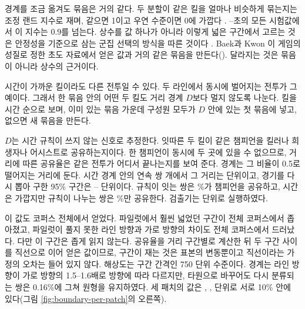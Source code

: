 

경계를 조금 옮겨도 묶음은 거의 같다. 두 분할이 같은 킬을 얼마나 비슷하게 묶는지는 조정 랜드 지수로 재며, 같으면 1이고 우연 수준이면 0에 가깝다 \cite{hubert1985comparing}. \ariPlateauLo{}--\ariPlateauHi{}초의 모든 시험값에서 이 지수는 0.9를 넘는다. 상수를 값 하나가 아니라 이렇게 넓은 구간에서 고르는 것은 안정성을 기준으로 삼는 군집 선택의 방식을 따른 것이다 \cite{campello2013hdbscan}. Baek과 Kwon \cite{baek2026killconditioned}이 게임의 성질로 정한 \cogGap{}초도 자료에서 얻은 값과 거의 같은 묶음을 만든다(\ariVsEighteen{}). 달라지는 것은 묶음이 아니라 상수의 근거이다.

시간이 가까운 킬이라도 다른 전투일 수 있다. 두 라인에서 동시에 벌어지는 전투가 그 예이다. 그래서 한 묶음 안의 어떤 두 킬도 거리 경계 $D$보다 멀지 않도록 나눈다. 킬을 시간 순으로 보며, 이미 있는 묶음 가운데 구성원 모두가 $D$ 안에 있는 첫 묶음에 넣고, 없으면 새 묶음을 만든다.

$D$는 시간 규칙이 쓰지 않는 신호로 추정한다. 잇따른 두 킬이 같은 챔피언을 킬러나 희생자나 어시스트로 공유하는지이다. 한 챔피언이 동시에 두 곳에 있을 수 없으므로, 거리에 따른 공유율은 같은 전투가 어디서 끝나는지를 보여 준다. 경계는 그 비율이 0.5로 떨어지는 거리에 둔다. 시간 경계 안의 연속 쌍 \numPairsDef{}개에서 그 거리는 \constDest{} 단위이고, 경기를 다시 뽑아 구한 95\% 구간은 \constDciLo{}--\constDciHi{} 단위이다. 규칙이 잇는 쌍은 \shareLinkedPairs{}\%가 챔피언을 공유하고, 시간은 가깝지만 규칙이 나누는 쌍은 \shareSeparatedPairs{}\%만 공유한다. 검출기는 \constD{} 단위로 실행하였다.

이 값도 코퍼스 전체에서 얻었다. 파일럿에서 훨씬 넓었던 구간이 전체 코퍼스에서 좁아졌고, 파일럿이 풀지 못한 라인 방향과 가로 방향의 차이도 전체 코퍼스에서 드러났다. 다만 이 구간은 좁게 읽지 않는다. 공유율을 거리 구간별로 계산한 뒤 두 구간 사이를 직선으로 이어 얻은 값이므로, 구간이 재는 것은 표본의 변동뿐이고 직선이라는 가정의 오차는 들어 있지 않다. 해상도는 구간 간격인 750 단위 수준이다. 경계는 라인 방향이 가로 방향의 1.5--1.6배로 방향에 따라 다르지만, 타원으로 바꾸어도 다시 분류되는 쌍은 0.16\%에 그쳐 원형을 유지하였다. 세 패치의 값은 \constDpatchA{}, \constDpatchB{}, \constDpatchC{} 단위로 서로 10\% 안에 있다(그림 \ref{fig:boundary-per-patch}의 오른쪽).
